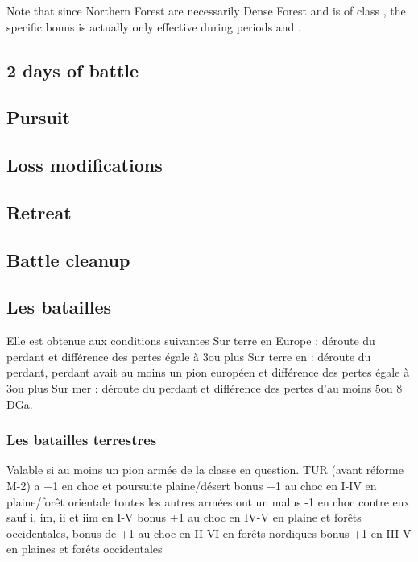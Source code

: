 Note that since Northern Forest are necessarily Dense Forest and \SUE is of
class \CAIIIM, the specific \SUE bonus is actually only effective during
periods  and .

\subsection{2 days of battle}
\label{chMilitary:Battle:Fight}


\subsection{Pursuit}
\label{chMilitary:Battle:Pursuit}
\subsection{Loss modifications}
\label{chMilitary:Battle:Loss modifications}
\subsection{Retreat}
\label{chMilitary:Battle:Retreat}
\subsection{Battle cleanup}
\label{chMilitary:Battle:Cleanup}


\iamhere

\subsection{Les batailles}
Elle est obtenue aux conditions suivantes
\bparag Sur terre en Europe : déroute du perdant et différence des
pertes égale à 3\LD ou plus
\bparag Sur terre en \ROTW : déroute du perdant, perdant avait au moins
un pion \ARMY européen et différence des pertes égale à 3\LD ou plus
\bparag Sur mer : déroute du perdant et différence des pertes
d'au moins 5\ND ou 8 DGa.

\subsubsection{Les batailles terrestres}
 Valable si au moins un pion armée
de la classe en question.
  TUR (avant réforme M-2) a +1 en choc et poursuite plaine/désert
\bparag[iim]  bonus +1 au choc en I-IV en plaine/forêt orientale
\bparag[tercios] toutes les autres armées ont un malus -1 en choc contre eux sauf
       i, im, ii et iim en I-V
\bparag[iiim] bonus +1 au choc en IV-V en plaine et forêts occidentales,
\bparag[SUE] bonus de +1 au choc en II-VI en forêts nordiques
\bparag[iv] bonus +1 en III-V en plaines et forêts occidentales

